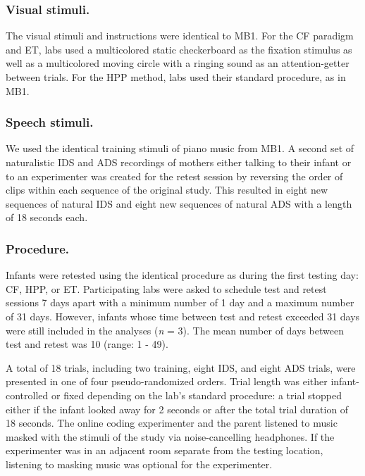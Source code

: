 \documentclass[
  man,floatsintext]{apa6}
\begin{document}
\hypertarget{visual-stimuli.}{%
\subsubsection{Visual stimuli.}\label{visual-stimuli.}}

The visual stimuli and instructions were identical to MB1.
For the CF paradigm and ET, labs used a multicolored static checkerboard as the fixation stimulus as well as a multicolored moving circle with a ringing sound as an attention-getter between trials.
For the HPP method, labs used their standard procedure, as in MB1.

\hypertarget{speech-stimuli.}{%
\subsubsection{Speech stimuli.}\label{speech-stimuli.}}

We used the identical training stimuli of piano music from MB1.
A second set of naturalistic IDS and ADS recordings of mothers either talking to their infant or to an experimenter was created for the retest session by reversing the order of clips within each sequence of the original study.
This resulted in eight new sequences of natural IDS and eight new sequences of natural ADS with a length of 18 seconds each.

\hypertarget{procedure.}{%
\subsubsection{Procedure.}\label{procedure.}}

Infants were retested using the identical procedure as during the first testing day: CF, HPP, or ET.
Participating labs were asked to schedule test and retest sessions 7 days apart with a minimum number of 1 day and a maximum number of 31 days.
However, infants whose time between test and retest exceeded 31 days were still included in the analyses (\emph{n} = 3).
The mean number of days between test and retest was 10 (range: 1 - 49).

A total of 18 trials, including two training, eight IDS, and eight ADS trials, were presented in one of four pseudo-randomized orders.
Trial length was either infant-controlled or fixed depending on the lab's standard procedure: a trial stopped either if the infant looked away for 2 seconds or after the total trial duration of 18 seconds.
The online coding experimenter and the parent listened to music masked with the stimuli of the study via noise-cancelling headphones.
If the experimenter was in an adjacent room separate from the testing location, listening to masking music was optional for the experimenter.
\end{document}
